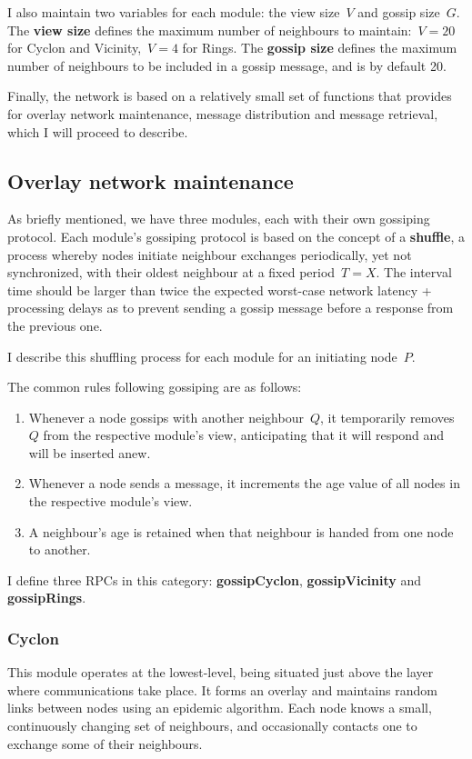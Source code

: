 \documentclass[10pt,a4paper,onecolumn]{article}
\begin{document}
I also maintain two variables for each module: the view size~$V$ and gossip size~$G$. The \textbf{view size} defines the maximum number of neighbours to maintain:~$V = 20$ for Cyclon and Vicinity,~$V = 4$ for Rings. The \textbf{gossip size} defines the maximum number of neighbours to be included in a gossip message, and is by default 20.

Finally, the network is based on a relatively small set of functions that provides for overlay network maintenance, message distribution and message retrieval, which I will proceed to describe.

\subsection{Overlay network maintenance}
As briefly mentioned, we have three modules, each with their own gossiping protocol. Each module's gossiping protocol is based on the concept of a \textbf{shuffle}, a process whereby nodes initiate neighbour exchanges periodically, yet not synchronized, with their oldest neighbour at a fixed period~$T = X$. The interval time should be larger than twice the expected worst-case network latency + processing delays as to prevent sending a gossip message before a response from the previous one. 

I describe this shuffling process for each module for an initiating node~$P$.

The common rules following gossiping are as follows:
\begin{enumerate}
\item Whenever a node gossips with another neighbour~$Q$, it temporarily removes~$Q$ from the respective module’s view, anticipating that it will respond and will be inserted anew. 
\item Whenever a node sends a message, it increments the age value of all nodes in the respective module's view.
\item A neighbour's age is retained when that neighbour is handed from one node to another.
\end{enumerate}

I define three RPCs in this category: \textbf{gossipCyclon}, \textbf{gossipVicinity} and \textbf{gossipRings}.

\subsubsection{Cyclon}
This module operates at the lowest-level, being situated just above the layer where communications take place. It forms an overlay and maintains random links between nodes using an epidemic algorithm. Each node knows a small, continuously changing set of neighbours, and occasionally contacts one to exchange some of their neighbours.
\end{document}
